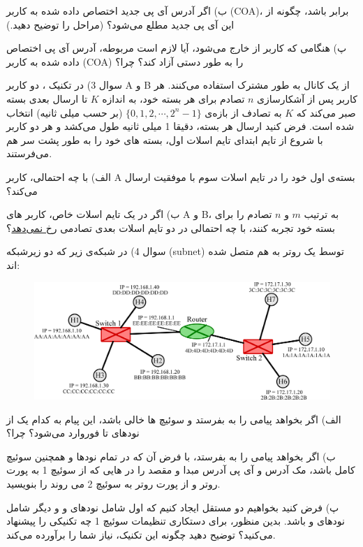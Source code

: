 \documentclass{article}
\begin{document}
ب) اگر آدرس آی پی جدید اختصاص داده شده به کاربر (COA)، برابر  باشد، چگونه  از این آی پی جدید مطلع می‌شود؟ (مراحل را توضیح دهید.)

پ) هنگامی که کاربر از  خارج می‌شود، آیا لازم است  مربوطه، آدرس آی پی اختصاص داده شده به کاربر (COA) را به طور دستی آزاد کند؟ چرا؟

\newpage
سوال 3) در تکنیک ، دو کاربر A و B از یک کانال به طور مشترک استفاده می‌کنند. هر کاربر پس از آشکارسازی $n$ تصادم برای هر بسته خود، به اندازه $K$ تا ارسال بعدی بسته صبر می‌کند که $K$ به تصادف از بازه‌ی 
$
\{0,1,2,\cdots ,2^n-1\}
$
(بر حسب میلی ثانیه) انتخاب شده است. فرض کنید ارسال هر بسته، دقیقا 1 میلی ثانیه طول می‌کشد و هر دو کاربر با شروع از تایم ابتدای تایم اسلات اول، بسته های خود را به طور پشت سر هم می‌فرستند.

الف) با چه احتمالی، کاربر A بسته‌ی اول خود را در تایم اسلات سوم با موفقیت ارسال می‌کند؟

ب) اگر در یک تایم اسلات خاص، کاربر های A و B، به ترتیب $m$ و $n$ تصادم را برای بسته خود تجربه کنند، با چه احتمالی در دو تایم اسلات بعدی تصادمی \underline{رخ نمی‌دهد}؟

\newpage
سوال 4) در شبکه‌ی زیر که دو زیرشبکه (subnet) توسط یک روتر به هم متصل شده اند:
\begin{figure}[htbp]
\centering
\includegraphics[width=150mm]{link_layer_1.eps}
\end{figure}

الف) اگر  بخواهد پیامی را به  بفرستد و  سوئیچ ها خالی باشد، این پیام به کدام یک از نودهای 
تا 
فوروارد می‌شود؟ چرا؟

ب) اگر  بخواهد پیامی را به  بفرستد، با فرض آن که  در تمام نودها و همچنین  سوئیچ کامل باشد، مک آدرس و آی پی آدرس مبدا و مقصد را در  هایی که از سوئیچ 1 به پورت  روتر و از پورت  روتر به سوئیچ 2 می روند را بنویسید.

پ) فرض کنید بخواهیم دو  مستقل ایجاد کنیم که  اول شامل نودهای 
و
و  دیگر شامل نودهای 
و
باشد. بدین منظور، برای دستکاری تنظیمات سوئیچ 1 چه تکنیکی را پیشنهاد می‌کنید؟ توضیح دهید چگونه این تکنیک، نیاز شما را برآورده می‌کند.
\end{document}
